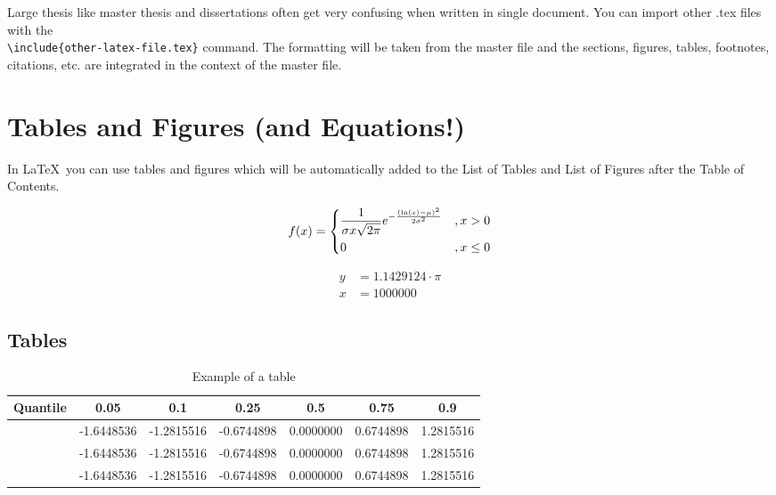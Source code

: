 \documentclass[masterarbeit, grey, english]{mas-thesis-sections}	%
\begin{document}
Large thesis like master thesis and dissertations often get very confusing when written in single document. You can import other .tex files with the\\\texttt{\textbackslash include\{other-latex-file.tex\}} command. The formatting will be taken from the master file and the sections, figures, tables, footnotes, citations, etc. are integrated in the context of the master file.

\section{Tables and Figures (and Equations!)}

In \LaTeX\ you can use tables and figures which will be automatically added to the List of Tables and List of Figures after the Table of Contents.

\begin{equation*}
        f(x) = 
        \begin{dcases}
            \frac{1}{\sigma x \sqrt{2 \pi}} e^{ - \frac{(\ln(x) - \mu)^2}{2 \sigma^2}} & , x > 0 \\
            0 & , x \leq 0
        \end{dcases}
\end{equation*}

\begin{align}
	y &= 1.1429124 \cdot \pi \\
	x &= 1000000
\end{align}

\subsection{Tables}

\begin{table}[ht]
\begin{center}
        \begin{tabular}{
            S[table-column-width=10mm]
            S[table-format=-1.6]
            S[table-format=-1.6]
            S[table-format=-1.6]
            S[table-format=-1.6]
            S[table-format=-1.6]
            S[table-format=-1.6]}
            \toprule
            {Quantile} & 0.05 & 0.1 & 0.25 & 0.5 & 0.75 & 0.9 \\ 
            \midrule
             & -1.6448536 & -1.2815516 & -0.6744898 & 0.0000000 & 0.6744898 & 1.2815516 \\ 
             & -1.6448536 & -1.2815516 & -0.6744898 & 0.0000000 & 0.6744898 & 1.2815516 \\ 
             & -1.6448536 & -1.2815516 & -0.6744898 & 0.0000000 & 0.6744898 & 1.2815516 \\ 
             \bottomrule
        \end{tabular}
	\caption{Example of a table}
	\label{table:1}
\end{center}
\end{table}
\end{document}
